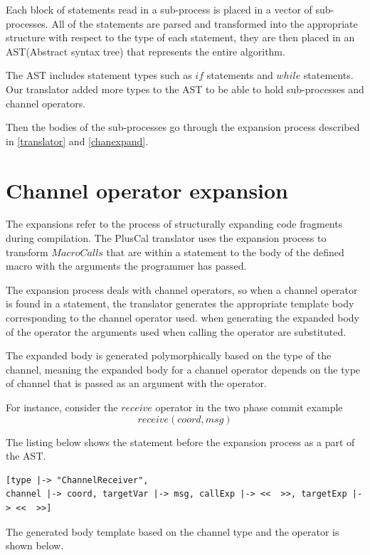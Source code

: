 \documentclass{thesul}
\begin{document}
Each block of statements read in a sub-process is placed in a vector of sub-processes. All of the statements are parsed and transformed into the appropriate structure with respect to the type of each statement, they are then placed in an AST(Abstract syntax tree) that represents the entire algorithm.

The AST includes statement types such as $if$ statements and $while$ statements. Our translator added more types to the AST to be able to hold sub-processes and channel operators.


Then the bodies of the sub-processes go through the expansion process described in \ref{translator} and \ref{chanexpand}.

\label{parsesub}
\section{Channel operator expansion}

The expansions refer to the process of structurally expanding code fragments during compilation. The PlusCal translator uses the expansion process to transform $Macro Calls$ that are within a statement to the body of the defined macro with the arguments the programmer has passed.

The expansion process deals with channel operators, so when a channel operator is found in a statement, the translator generates the appropriate template body corresponding to the channel operator used. when generating the expanded body of the operator the arguments used when calling the operator are substituted.

The expanded body is generated polymorphically based on the type of the channel, meaning the expanded body for a channel operator  depends on the type of channel that is passed as an argument with the operator.

For instance, consider the $receive$ operator in the two phase commit example
\[
receive(coord, msg)
\]

The listing below shows the statement before the expansion process as a part of the AST.

\begin{lstlisting}
[type |-> "ChannelReceiver",
channel |-> coord, targetVar |-> msg, callExp |-> <<  >>, targetExp |-> <<  >>]

\end{lstlisting}

The generated body template based on the channel type and the operator is shown below.
\end{document}
